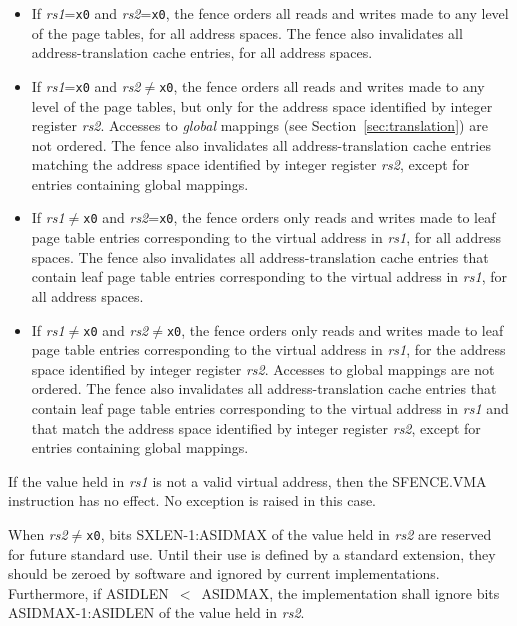 \begin{itemize}
\item If {\em rs1}={\tt x0} and {\em rs2}={\tt x0}, the fence orders all
      reads and writes made to any level of the page tables, for all
      address spaces.  The fence also invalidates all address-translation
      cache entries, for all address spaces.
\item If {\em rs1}={\tt x0} and {\em rs2}$\neq${\tt x0}, the fence orders
      all reads and writes made to any level of the page tables, but only
      for the address space identified by integer register {\em rs2}.
      Accesses to {\em global} mappings (see Section~\ref{sec:translation})
      are not ordered.  The fence also invalidates all address-translation
      cache entries matching the address space identified by integer register
      {\em rs2}, except for entries containing global mappings.
\item If {\em rs1}$\neq${\tt x0} and {\em rs2}={\tt x0}, the fence orders
      only reads and writes made to leaf page table entries corresponding
      to the virtual address in {\em rs1}, for all address spaces.
      The fence also invalidates all address-translation cache entries that
      contain leaf page table entries corresponding to the virtual address
      in {\em rs1}, for all address spaces.
\item If {\em rs1}$\neq${\tt x0} and {\em rs2}$\neq${\tt x0}, the fence
      orders only reads and writes made to leaf page table entries
      corresponding to the virtual address in {\em rs1}, for the address
      space identified by integer register {\em rs2}.
      Accesses to global mappings are not ordered.  The fence also
      invalidates all address-translation cache entries that contain leaf
      page table entries corresponding to the virtual address in {\em rs1}
      and that match the address space identified by integer register {\em
      rs2}, except for entries containing global mappings.
\end{itemize}

If the value held in {\em rs1} is not a valid virtual address, then the
SFENCE.VMA instruction has no effect.  No exception is raised in this case.

When {\em rs2}$\neq${\tt x0}, bits SXLEN-1:ASIDMAX of the value held in {\em
rs2} are reserved for future standard use.  Until their use is defined by a
standard extension, they should be zeroed by software and ignored
by current implementations.  Furthermore, if ASIDLEN~$<$~ASIDMAX, the
implementation shall ignore bits ASIDMAX-1:ASIDLEN of the value held in {\em
rs2}.

